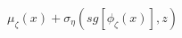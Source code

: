 \documentclass[preview]{standalone}
\begin{document}
\begin{align*}
\mu_{\zeta}(x) + \sigma_{\eta}(sg[\phi_\zeta (x)],z)
\end{align*}
\end{document}
